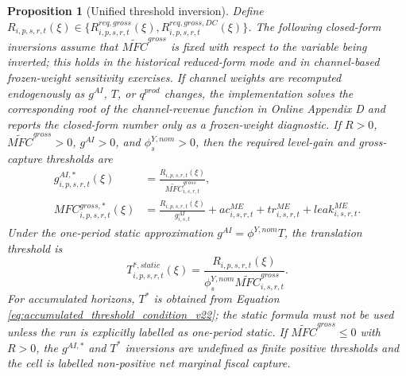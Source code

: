 \documentclass[11pt,a4paper]{article}
\newtheorem{proposition}{Proposition}
\begin{document}
\begin{proposition}[Unified threshold inversion]\label{prop:unified_inversion}
Define $R_{i,p,s,r,t}(\xi)\in\{R^{req,gross}_{i,p,s,r,t}(\xi),R^{req,gross,DC}_{i,p,s,r,t}(\xi)\}$. The following closed-form inversions assume that $\widetilde{MFC}^{gross}$ is fixed with respect to the variable being inverted; this holds in the historical reduced-form mode and in channel-based frozen-weight sensitivity exercises. If channel weights are recomputed endogenously as $g^{AI}$, $T$, or $q^{prod}$ changes, the implementation solves the corresponding root of the channel-revenue function in Online Appendix D and reports the closed-form number only as a frozen-weight diagnostic. If $R>0$, $\widetilde{MFC}^{gross}>0$, $g^{AI}>0$, and $\phi^{Y,nom}_s>0$, then the required level-gain and gross-capture thresholds are
\begin{align}
    g^{AI,*}_{i,p,s,r,t}(\xi)&=\frac{R_{i,p,s,r,t}(\xi)}{\widetilde{MFC}^{gross}_{i,s,r,t}},\\
    MFC^{gross,*}_{i,p,s,r,t}(\xi)&=\frac{R_{i,p,s,r,t}(\xi)}{g^{AI}_{i,s,t}}+ac^{ME}_{i,s,r,t}+tr^{ME}_{i,s,r,t}+leak^{ME}_{i,s,r,t}.
\end{align}
Under the one-period static approximation $g^{AI}=\phi^{Y,nom}T$, the translation threshold is
\begin{equation}
    T^{*,static}_{i,p,s,r,t}(\xi)=\frac{R_{i,p,s,r,t}(\xi)}{\phi^{Y,nom}_s\widetilde{MFC}^{gross}_{i,s,r,t}}.
\end{equation}
For accumulated horizons, $T^*$ is obtained from Equation \eqref{eq:accumulated_threshold_condition_v22}; the static formula must not be used unless the run is explicitly labelled as one-period static. If $\widetilde{MFC}^{gross}\leq0$ with $R>0$, the $g^{AI,*}$ and $T^*$ inversions are undefined as finite positive thresholds and the cell is labelled non-positive net marginal fiscal capture.
\end{proposition}
\end{document}
